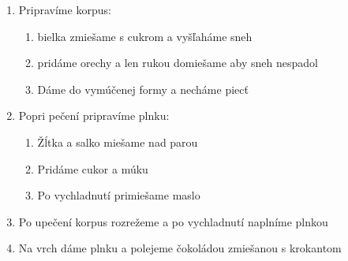 \begin{recipe}

\begin{enumerate}


\item{Pripravíme korpus:}
\begin{enumerate}
\item{bielka zmiešame s cukrom a vyšľaháme sneh}
\item{pridáme orechy a len rukou domiešame aby sneh nespadol}
\item{Dáme do vymúčenej formy a necháme piecť}
\end{enumerate}

\item{Popri pečení pripravíme plnku:}

\begin{enumerate}
\item{Žĺtka a salko miešame nad parou}
\item{Pridáme cukor a múku}
\item{Po vychladnutí primiešame maslo}
\end{enumerate}

\item{Po upečení korpus rozrežeme a po vychladnutí naplníme plnkou}
\item{Na vrch dáme plnku a polejeme čokoládou zmiešanou s krokantom}


\end{enumerate}
\end{recipe}


\clearpage	